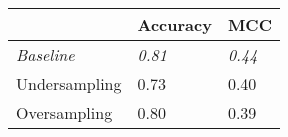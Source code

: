 \begin{tabular}{lll}
\toprule
     & \textbf{Accuracy} & \textbf{MCC}  \\
\midrule
\textit{Baseline}           & \textit{0.81}     & \textit{0.44} \\
Undersampling               & 0.73              & 0.40          \\
Oversampling                & 0.80              & 0.39          \\
\bottomrule
\end{tabular}
